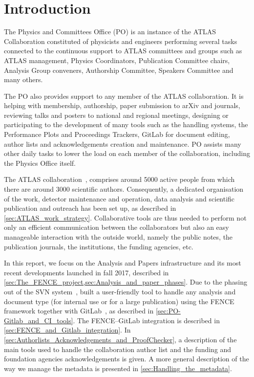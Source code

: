 
\section{Introduction}%
\label{sec:Introduction}

The Physics and Committees Office (PO) is an instance of the ATLAS Collaboration constituted of physicists and engineers performing several tasks connected to the continuous support to ATLAS committees and groups such as ATLAS management, Physics Coordinators, Publication Committee chairs, Analysis Group conveners, Authorship Committee, Speakers 
Committee and many others.
                    
The PO also provides support to any member of the ATLAS collaboration. It is helping with membership, authorship, paper submission to arXiv and journals, reviewing talks and posters to national and regional meetings, designing or participating to the development of many tools such as the  handling systems, the Performance Plots and Proceedings Trackers, GitLab for document editing, author lists and acknowledgements creation and maintenance.
PO assists many other daily tasks to lower the load on each member of the collaboration, including the Physics Office itself.

The ATLAS collaboration~\cite{PERF-2007-01}, comprises around 5000 active people from which there are around 3000 scientific authors.
Consequently, a dedicated organisation of the work, detector maintenance and operation, data analysis and scientific publication and outreach has been set up, as described in \cref{sec:ATLAS_work_strategy}.
Collaborative tools are thus needed to perform not only an efficient communication between the collaborators but also an easy manageable interaction with the outside world, namely the public notes, the publication journals, the institutions, the funding agencies, etc.
                    
In this report, we focus on the Analysis and Papers infrastructure and its most recent developments launched in fall 2017, described in \cref{sec:The_FENCE_project,sec:Analysis_and_paper_phases}.
Due to the phasing out of the SVN system~\cite{svn},  built a user-friendly tool to handle any analysis and document type (for internal use or for a large publication) using the FENCE framework  together with GitLab~\cite{gitlab}, as described in \cref{sec:PO-Gitlab_and_CI_tools}.
The FENCE--GitLab integration is described in \cref{sec:FENCE_and_Gitlab_integration}. In \cref{sec:Authorlists_Acknowledgements_and_ProofChecker}, a description of the main tools used to handle the collaboration author list and the funding and foundation agencies acknowledgements is given.
A more general description of the way we manage the metadata is presented in \cref{sec:Handling_the_metadata}.